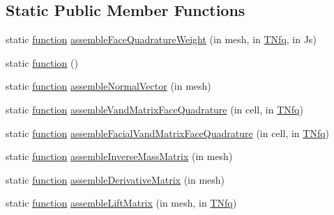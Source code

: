 \subsection*{Static Public Member Functions}
\begin{DoxyCompactItemize}
\item 
static \hyperlink{class_ndg_gauss_quad_strong_form_solver_af755d69cea40fa91c0aab6b13409e11f}{function} \hyperlink{class_ndg_gauss_quad_strong_form_solver_a1a376e18b2ad65c8c3d5bec067240ca8}{assemble\+Face\+Quadrature\+Weight} (in mesh, in \hyperlink{class_ndg_gauss_quad_strong_form_solver_addd134051c5bdd3a93939e5cb7bacaf3}{T\+Nfq}, in Js)
\item 
static \hyperlink{class_ndg_gauss_quad_strong_form_solver_af755d69cea40fa91c0aab6b13409e11f}{function} ()
\item 
static \hyperlink{class_ndg_gauss_quad_strong_form_solver_af755d69cea40fa91c0aab6b13409e11f}{function} \hyperlink{class_ndg_gauss_quad_strong_form_solver_a9f6a3c8cb76546c76838296ab4537f75}{assemble\+Normal\+Vector} (in mesh)
\item 
static \hyperlink{class_ndg_gauss_quad_strong_form_solver_af755d69cea40fa91c0aab6b13409e11f}{function} \hyperlink{class_ndg_gauss_quad_strong_form_solver_aaec1575e56f61e8fd8be4e9c739b676a}{assemble\+Vand\+Matrix\+Face\+Quadrature} (in cell, in \hyperlink{class_ndg_gauss_quad_strong_form_solver_addd134051c5bdd3a93939e5cb7bacaf3}{T\+Nfq})
\item 
static \hyperlink{class_ndg_gauss_quad_strong_form_solver_af755d69cea40fa91c0aab6b13409e11f}{function} \hyperlink{class_ndg_gauss_quad_strong_form_solver_a78b7785ca8c0a06c124046dd870e5e60}{assemble\+Facial\+Vand\+Matrix\+Face\+Quadrature} (in cell, in \hyperlink{class_ndg_gauss_quad_strong_form_solver_addd134051c5bdd3a93939e5cb7bacaf3}{T\+Nfq})
\item 
static \hyperlink{class_ndg_gauss_quad_strong_form_solver_af755d69cea40fa91c0aab6b13409e11f}{function} \hyperlink{class_ndg_gauss_quad_strong_form_solver_a33d2b279732d5e50f95644eb0f8dff05}{assemble\+Inverse\+Mass\+Matrix} (in mesh)
\item 
static \hyperlink{class_ndg_gauss_quad_strong_form_solver_af755d69cea40fa91c0aab6b13409e11f}{function} \hyperlink{class_ndg_gauss_quad_strong_form_solver_a22de5bee50598fa7abd33471ba7ad75c}{assemble\+Derivative\+Matrix} (in mesh)
\item 
static \hyperlink{class_ndg_gauss_quad_strong_form_solver_af755d69cea40fa91c0aab6b13409e11f}{function} \hyperlink{class_ndg_gauss_quad_strong_form_solver_a955b36cf67082719f505f0b4ba747f27}{assemble\+Lift\+Matrix} (in mesh, in \hyperlink{class_ndg_gauss_quad_strong_form_solver_addd134051c5bdd3a93939e5cb7bacaf3}{T\+Nfq})
\end{DoxyCompactItemize}
